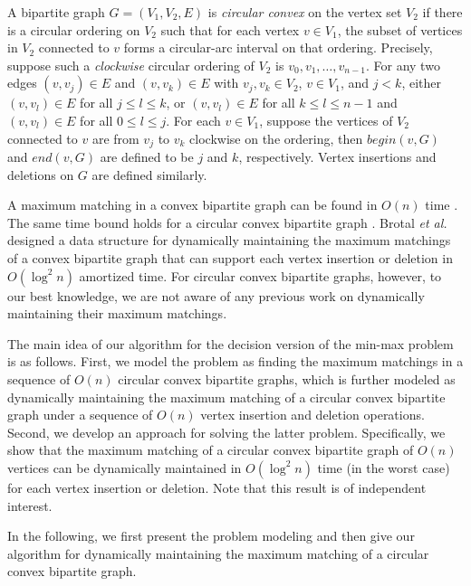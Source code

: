\documentclass[11pt]{article}
\begin{document}
A bipartite graph $G= (V_1, V_2, E)$ is {\it circular convex} on
the vertex set $V_2$ if there is a circular ordering on $V_2$ such
that for each vertex $v \in V_1$, the subset of vertices in $V_2$
connected to $v$ forms a circular-arc interval on that ordering. Precisely,
suppose such a {\em clockwise} circular ordering of $V_2$ is $v_0,v_1,\ldots,v_{n-1}$.
For any two edges $(v, v_j) \in E$ and $(v, v_k) \in E$ with
$v_j, v_k \in V_2$, $v\in V_1$, and $j< k$, either
$(v, v_l) \in E$ for all $j \leq l \leq k$, or $(v, v_l) \in E$ for all $k
\leq l \leq n-1$ and $(v, v_l) \in E$ for all $0 \leq l \leq j$. For
each $v\in V_1$, suppose the vertices of $V_2$ connected to $v$ are
from $v_j$ to $v_k$ clockwise on the ordering, then $begin(v,G)$ and
$end(v,G)$ are defined to be $j$ and $k$, respectively.
Vertex insertions and deletions on $G$ are defined similarly.




A maximum matching in a convex bipartite graph can be found in
$O(n)$ time \cite{ref:GabowA85,ref:LipskiEf81,ref:SteinerA96}. The
same time bound holds for a circular convex bipartite graph
\cite{ref:LiangCi95}. Brotal {\em et al.}~\cite{ref:BrodalDy07} designed
a data structure for dynamically maintaining the maximum matchings of
a convex bipartite graph that can support each vertex insertion or
deletion in $O(\log^2 n)$ amortized time. For circular convex
bipartite graphs, however, to our best knowledge, we are not aware of
any previous work on dynamically maintaining their maximum matchings.

The main idea of our algorithm for the decision version of the
min-max problem is as follows. First, we model the problem as
finding the maximum matchings in a sequence of $O(n)$ circular convex
bipartite graphs, which is further modeled as dynamically
maintaining the maximum matching of a circular convex bipartite
graph under a sequence of $O(n)$ vertex insertion and deletion operations.
Second, we develop an approach for solving the latter problem.
Specifically, we show that the maximum matching of a circular convex
bipartite graph of $O(n)$ vertices can be dynamically maintained in $O(\log^2 n)$ time
(in the worst case) for each vertex insertion or deletion. Note that
this result is of independent interest.



In the following, we first present the problem modeling and then
give our algorithm for dynamically maintaining the maximum matching of
a circular convex bipartite graph.
\end{document}
